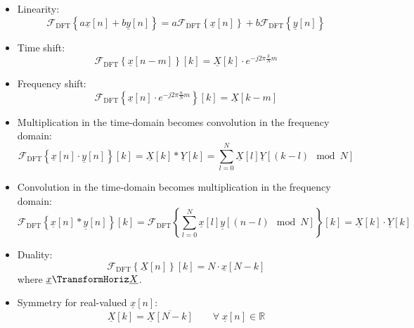 \begin{refsection}
\begin{itemize}
	\item Linearity:
	\begin{equation}
		\mathcal{F}_{\text{DFT}}\left\{a \underline{x}[n] + b \underline{y}[n]\right\} = a \mathcal{F}_{\text{DFT}}\left\{\underline{x}[n]\right\} + b \mathcal{F}_{\text{DFT}}\left\{\underline{y}[n]\right\}
	\end{equation}
	\item Time shift:
	\begin{equation}
		\mathcal{F}_{\text{DFT}}\left\{\underline{x}[n - m]\right\}[k] = \underline{X}[k] \cdot e^{-j 2 \pi \frac{k}{N} m}
	\end{equation}
	\item Frequency shift:
	\begin{equation}
		\mathcal{F}_{\text{DFT}}\left\{\underline{x}[n] \cdot e^{-j 2 \pi \frac{n}{N} m}\right\}[k] = \underline{X}[k-m]
	\end{equation}
	\item Multiplication in the time-domain becomes convolution in the frequency domain:
	\begin{equation}
		\mathcal{F}_{\text{DFT}}\left\{\underline{x}[n] \cdot \underline{y}[n]\right\}[k] = \underline{X}[k] * \underline{Y}[k] = \sum_{l=0}^{N} \underline{X}[l] \underline{Y}[(k - l) \mod N]
	\end{equation}
	\item Convolution in the time-domain becomes multiplication in the frequency domain:
	\begin{equation}
		\mathcal{F}_{\text{DFT}}\left\{\underline{x}[n] * \underline{y}[n]\right\}[k] = \mathcal{F}_{\text{DFT}}\left\{\sum_{l=0}^{N} \underline{x}[l] \underline{y}[(n - l) \mod N]\right\}[k] = \underline{X}[k] \cdot \underline{Y}[k]
	\end{equation}
	\item Duality:
	\begin{equation}
		\mathcal{F}_{\text{DFT}}\left\{\underline{X}[n]\right\}[k] = N \cdot \underline{x}[N - k]
	\end{equation}
	where $\underline{x} \TransformHoriz \underline{X}$.
	\item Symmetry for real-valued $\underline{x}[n]$:
	\begin{equation}
		\underline{X}[k] = \overline{\underline{X}[N-k]} \qquad \forall \; \underline{x}[n] \in \mathbb{R}
	\end{equation}
\end{itemize}


\end{refsection}
